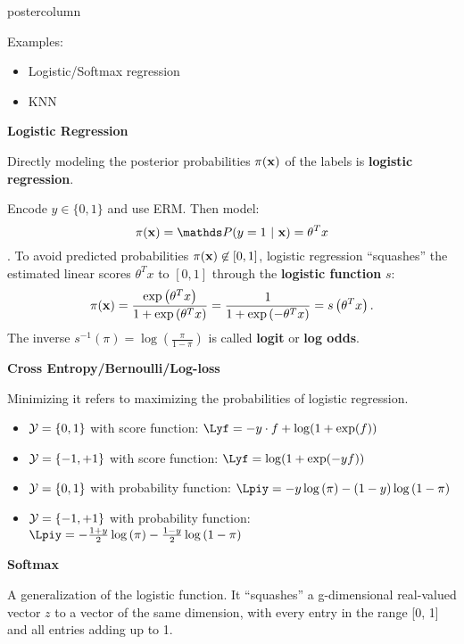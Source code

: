 \documentclass{beamer}
\begin{document}
\begin{frame}[fragile]{}
\begin{columns}
\begin{column}{.31\textwidth}
\begin{beamercolorbox}[center]{postercolumn}
\begin{minipage}{.98\textwidth}
{\begin{myblock}{}
  \begin{codebox}
    Examples:
  \end{codebox}
    
    \begin{itemize}[$\bullet$]     
    \setlength{\itemindent}{+.3in}
    \item Logistic/Softmax regression
    \item KNN
    \end{itemize}
  
  \begin{codebox}
  \textbf{Logistic Regression}
  \end{codebox}
  Directly modeling the posterior probabilities $\pi(\mathbf{x})$ of the labels is \textbf{logistic regression}.
  
  Encode $y \in \{0, 1\}$ and use ERM. Then model: \[ \pix = \post = \theta^T x\].
  To avoid predicted probabilities $\pi(\mathbf{x}) \not\in [0,1]$, logistic regression \enquote{squashes} the estimated linear scores $\theta^T x$ to \hspace*{1ex}$[0,1]$ through the \textbf{logistic function} $s$:
  $$ \pi(\mathbf{x}) = \frac{\exp\left(\theta^Tx\right)}{1+\exp\left(\theta^Tx\right)} = \frac{1}{1+\exp\left(-\theta^Tx\right)} = s\left(\theta^T x\right).$$
  The inverse $s^{-1}(\pi) = \log\left(\frac{\pi}{1 - \pi}\right)$ is called \textbf{logit} or \textbf{log odds}.

  \begin{codebox}
  \textbf{Cross Entropy/Bernoulli/Log-loss}
  \end{codebox}
  Minimizing it refers to maximizing the probabilities of logistic regression.

  \begin{itemize}[$\bullet$]
    \setlength{\itemindent}{+.3in}
      \item $\mathcal{Y} = \{0, 1\}$ with score function: $\Lyf = - y \cdot f + \log(1 + \exp(f))$ 
      \item $\mathcal{Y} = \{-1, +1\}$ with score function: $\Lyf = \log(1+\exp(-yf))$
      \item $\mathcal{Y} = \{0, 1\}$ with probability function: $\Lpiy = - y \log \left(\pi\right) - (1 - y) \log \left(1 - \pi\right)$
      \item $\mathcal{Y} = \{-1, +1\}$ with probability function: $\Lpiy = - \frac{1 + y}{2} \log\left(\pi\right) - \frac{1 - y}{2} \log\left(1 - \pi\right)$
  \end{itemize}

  \begin{codebox}
  \textbf{Softmax}
  \end{codebox}
  A generalization of the logistic function. It \enquote{squashes} a g-dimensional real-valued vector $z$ to a vector of the same dimension,
  with every entry in the range [0, 1] and all entries adding up to 1.


\end{myblock}}
\end{minipage}
\end{beamercolorbox}
\end{column}
\end{columns}
\end{frame}
\end{document}
